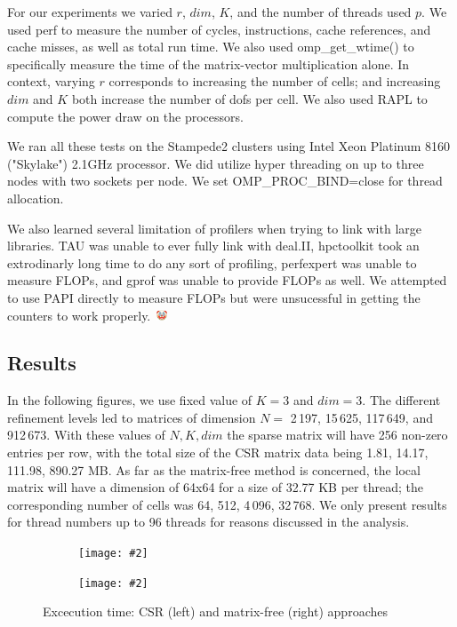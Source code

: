 \documentclass[12pt]{article}
\newcommand{\includegraphicsw}[2][1.]{\texttt{[image: \#2]}}
\begin{document}
For our experiments we varied $r$, $dim$, $K$, and the number of threads used $p$. We used perf to measure the number of cycles, instructions, cache references, and cache misses, as well as total run time. We also used omp\_get\_wtime() to specifically measure the time of the matrix-vector multiplication alone. In context, varying $r$ corresponds to increasing the number of cells; and increasing $dim$ and $K$ both increase the number of dofs per cell. We also used RAPL to compute the power draw on the processors.

We ran all these tests on the Stampede2 clusters using Intel Xeon Platinum 8160 ("Skylake") 2.1GHz processor. We did utilize hyper threading on up to three nodes with two sockets per node. We set OMP\_PROC\_BIND=close for thread allocation.

We also learned several limitation of profilers when trying to link with large libraries. TAU was unable to ever fully link with deal.II, hpctoolkit took an extrodinarly long time to do any sort of profiling, perfexpert was unable to measure FLOPs, and gprof was unable to provide FLOPs as well. We attempted to use PAPI directly to measure FLOPs but were unsucessful in getting the counters to work properly.~\includegraphics[width=12px]{clown.png}


\subsection{Results}
In the following figures, we use fixed value of $K = 3$ and $dim = 3$. The different refinement levels led to matrices of dimension $N =$ 2\,197, 15\,625, 117\,649, and 912\,673. With these values of $N, K, dim$ the sparse matrix will have 256 non-zero entries per row, with the total size of the CSR matrix data being 1.81, 14.17, 111.98, 890.27 MB. As far as the matrix-free method is concerned, the local matrix will have a dimension of 64x64 for a size of 32.77 KB per thread; the corresponding number of cells was 64, 512, 4\,096, 32\,768. We only present results for thread numbers up to 96 threads for reasons discussed in the analysis.

\begin{figure}[H]
	\centering
	\begin{subfigure}{.5\linewidth}
		\includegraphicsw{clTime.pdf}
	\end{subfigure}%
	\begin{subfigure}{.5\linewidth}
		\includegraphicsw{mfTime.pdf}
	\end{subfigure}%
	\caption{Excecution time: CSR (left) and matrix-free (right) approaches}\label{fig:time}
\end{figure}
\end{document}
